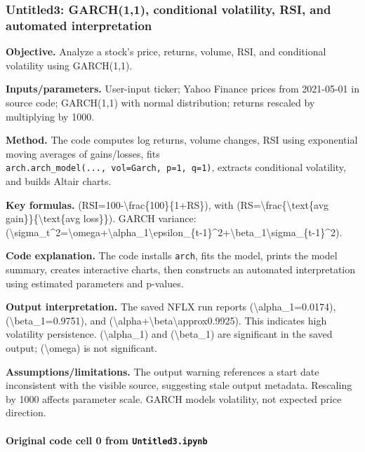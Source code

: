 \documentclass[
  11pt,
]{article}
\begin{document}
\subsubsection{Untitled3: GARCH(1,1), conditional volatility, RSI, and automated interpretation}\label{untitled3-garch11-conditional-volatility-rsi-and-automated-interpretation}

\textbf{Objective.} Analyze a stock's price, returns, volume, RSI, and conditional volatility using GARCH(1,1).

\textbf{Inputs/parameters.} User-input ticker; Yahoo Finance prices from 2021-05-01 in source code; GARCH(1,1) with normal distribution; returns rescaled by multiplying by 1000.

\textbf{Method.} The code computes log returns, volume changes, RSI using exponential moving averages of gains/losses, fits \texttt{arch.arch\_model(...,\ vol=\textquotesingle{}Garch\textquotesingle{},\ p=1,\ q=1)}, extracts conditional volatility, and builds Altair charts.

\textbf{Key formulas.} (RSI=100-\textbackslash frac\{100\}\{1+RS\}), with (RS=\textbackslash frac\{\textbackslash text\{avg gain\}\}\{\textbackslash text\{avg loss\}\}). GARCH variance: (\textbackslash sigma\_t\^{}2=\textbackslash omega+\textbackslash alpha\_1\textbackslash epsilon\_\{t-1\}\^{}2+\textbackslash beta\_1\textbackslash sigma\_\{t-1\}\^{}2).

\textbf{Code explanation.} The code installs \texttt{arch}, fits the model, prints the model summary, creates interactive charts, then constructs an automated interpretation using estimated parameters and p-values.

\textbf{Output interpretation.} The saved NFLX run reports (\textbackslash alpha\_1=0.0174), (\textbackslash beta\_1=0.9751), and (\textbackslash alpha+\textbackslash beta\textbackslash approx0.9925). This indicates high volatility persistence. (\textbackslash alpha\_1) and (\textbackslash beta\_1) are significant in the saved output; (\textbackslash omega) is not significant.

\textbf{Assumptions/limitations.} The output warning references a start date inconsistent with the visible source, suggesting stale output metadata. Rescaling by 1000 affects parameter scale. GARCH models volatility, not expected price direction.

\paragraph{\texorpdfstring{Original code cell 0 from \texttt{Untitled3.ipynb}}{Original code cell 0 from Untitled3.ipynb}}\label{original-code-cell-0-from-untitled3ipynb}
\end{document}
